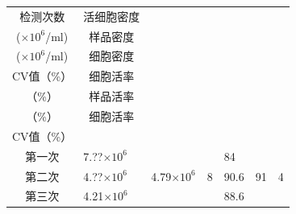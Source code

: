 \documentclass[UTF8,10pt,a4paper,fontset=fandol]{ctexart}
\newcommand{\fieldvalue}[1]{#1}
\newcommand{\handwritten}[1]{#1}
\begin{document}
\begin{center}
\begin{tabularx}{\textwidth}{|c|X|X|X|X|X|X|}
\hline
检测次数 &
\multicolumn{1}{c|}{活细胞密度}\\
($\times10^6$/ml) &
\multicolumn{1}{c|}{样品密度}\\
($\times10^6$/ml) &
\multicolumn{1}{c|}{细胞密度}\\
CV值（\%） &
\multicolumn{1}{c|}{细胞活率}\\
（\%） &
\multicolumn{1}{c|}{样品活率}\\
（\%） &
\multicolumn{1}{c|}{细胞活率}\\
CV值（\%）\\
\hline
第一次 &
\fieldvalue{\handwritten{7.??$\times10^6$}} &
&
&
\fieldvalue{\handwritten{84}} &
&
\\
\hline
第二次 &
\fieldvalue{\handwritten{4.??$\times10^6$}} &
\fieldvalue{\handwritten{4.79$\times10^6$}} &
\fieldvalue{\handwritten{8}} &
\fieldvalue{\handwritten{90.6}} &
\fieldvalue{\handwritten{91}} &
\fieldvalue{\handwritten{4}}\\
\hline
第三次 &
\fieldvalue{\handwritten{4.21$\times10^6$}} &
&
&
\fieldvalue{\handwritten{88.6}} &
&
\\
\hline
\end{tabularx}
\end{center}
\end{document}
